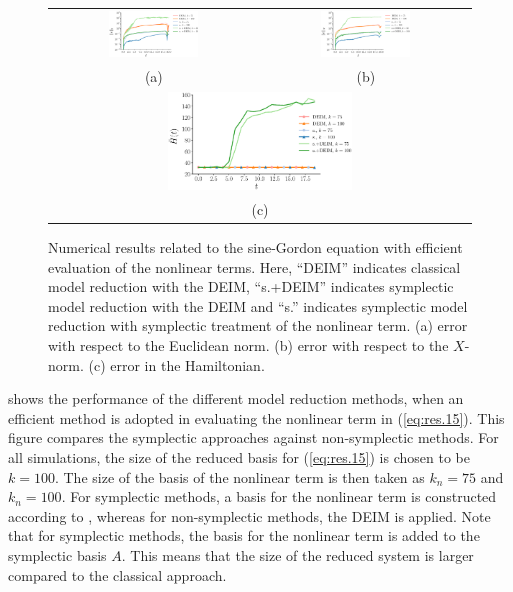 \begin{figure} \label{fig:3}
\begin{tabular}{cc}
\includegraphics[width=0.45\textwidth]{./figs/sine/nonlinear/l2} & \includegraphics[width=0.45\textwidth]{./figs/sine/nonlinear/energy_norm} \\
(a) & (b) \\
\multicolumn{2}{c}{
\includegraphics[width=0.45\textwidth]{./figs/sine/nonlinear/energy}
} \\
\multicolumn{2}{c}{(c)} \\
\end{tabular}
\caption{Numerical results related to the sine-Gordon equation with efficient evaluation of the nonlinear terms. Here, ``DEIM'' indicates classical model reduction with the DEIM, ``s.+DEIM'' indicates symplectic model reduction with the DEIM and ``s.'' indicates symplectic model reduction with symplectic treatment of the nonlinear term. (a) error with respect to the Euclidean norm. (b) error with respect to the $X$-norm. (c) error in the Hamiltonian. }
\end{figure}

 shows the performance of the different model reduction methods, when an efficient method is adopted in evaluating the nonlinear term in (\ref{eq:res.15}). This figure compares the symplectic approaches against non-symplectic methods. For all simulations, the size of the reduced basis for (\ref{eq:res.15}) is chosen to be $k=100$. The size of the basis of the nonlinear term is then taken as $k_n=75$ and $k_n=100$. For symplectic methods, a basis for the nonlinear term is constructed according to , whereas for non-symplectic methods, the DEIM is applied. Note that for symplectic methods, the basis for the nonlinear term is added to the symplectic basis $A$. This means that the size of the reduced system is larger compared to the classical approach.

